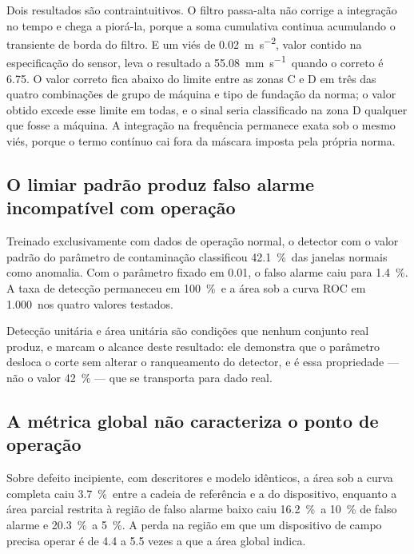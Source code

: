 Dois resultados são contraintuitivos. O filtro passa-alta não corrige a integração no
tempo e chega a piorá-la, porque a soma cumulativa continua acumulando o transiente de
borda do filtro. E um viés de \SI{0,02}{\meter\per\second\squared}\pE, valor contido na
especificação do sensor, leva o resultado a \SI{55,08}{\milli\meter\per\second}\pS\ quando
o correto é \num{6,75}. O valor correto fica abaixo do limite entre as zonas C e D em três
das quatro combinações de grupo de máquina e tipo de fundação da norma; o valor obtido
excede esse limite em todas, e o sinal seria classificado na zona D qualquer que fosse a
máquina. A integração na frequência permanece exata sob o mesmo viés, porque o termo
contínuo cai fora da máscara imposta pela própria norma.

\subsection{O limiar padrão produz falso alarme incompatível com operação}

Treinado exclusivamente com dados de operação normal, o detector com o valor padrão do
parâmetro de contaminação classificou \SI{42,1}{\percent}\pS\ das janelas normais como
anomalia. Com o parâmetro fixado em \num{0,01}, o falso alarme caiu para
\SI{1,4}{\percent}\pS. A taxa de detecção permaneceu em \SI{100}{\percent}\pS\ e a área sob
a curva ROC em \num{1,000}\pS\ nos quatro valores testados.

Detecção unitária e área unitária são condições que nenhum conjunto real produz, e marcam
o alcance deste resultado: ele demonstra que o parâmetro desloca o corte sem alterar o
ranqueamento do detector, e é essa propriedade --- não o valor \SI{42}{\percent} --- que se
transporta para dado real.

\subsection{A métrica global não caracteriza o ponto de operação}

Sobre defeito incipiente, com descritores e modelo idênticos, a área sob a curva completa
caiu \SI{3,7}{\percent}\pS\ entre a cadeia de referência e a do dispositivo, enquanto a
área parcial restrita à região de falso alarme baixo caiu \SI{16,2}{\percent}\pS\ a
\SI{10}{\percent} de falso alarme e \SI{20,3}{\percent}\pS\ a \SI{5}{\percent}. A perda na
região em que um dispositivo de campo precisa operar é de \num{4,4} a \num{5,5} vezes a que
a área global indica.

